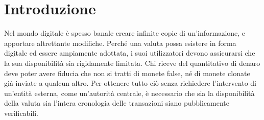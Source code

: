 \chapter{Introduzione}
\label{chapter:introduzione}

Nel mondo digitale è spesso banale creare infinite copie di un’informazione, e apportare altrettante modifiche. Perché una valuta possa esistere in forma digitale ed essere ampiamente adottata, i suoi utilizzatori devono assicurarsi che la sua disponibilità sia rigidamente limitata. Chi riceve del quantitativo di denaro deve poter avere fiducia che non si tratti di monete false, né di monete clonate già inviate a qualcun altro. Per ottenere tutto ciò senza richiedere l’intervento di un'entità esterna, come un’autorità centrale, è necessario che sia la disponibilità della valuta sia l’intera cronologia delle transazioni siano pubblicamente verificabili.

